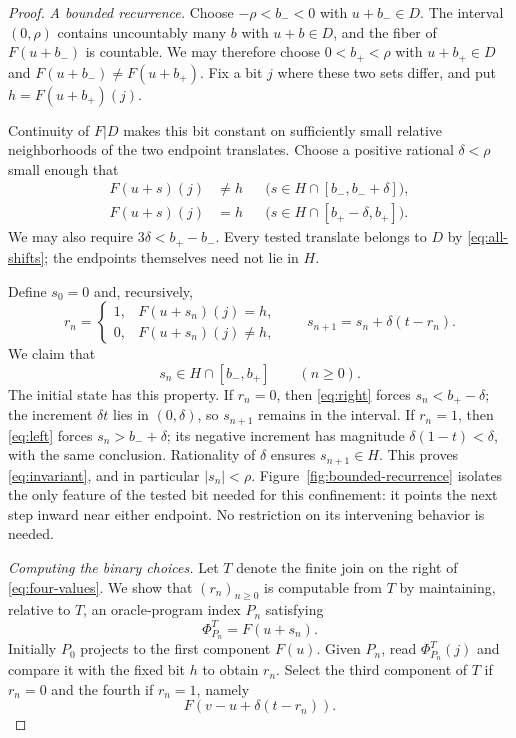 \begin{proof}
\medskip
\noindent\emph{A bounded recurrence.}
Choose $-\rho<b_-<0$ with $u+b_-\in D$. The interval
$(0,\rho)$ contains uncountably many $b$ with $u+b\in D$,
and the fiber of $F(u+b_-)$ is countable. We may therefore
choose $0<b_+<\rho$ with $u+b_+\in D$ and
$F(u+b_-)\ne F(u+b_+)$. Fix a bit $j$ where these two
sets differ, and put $h=F(u+b_+)(j)$.

Continuity of $F|D$ makes this bit constant on sufficiently
small relative neighborhoods of the two endpoint translates.
Choose a positive rational $\delta<\rho$ small enough that
\begin{align}
F(u+s)(j)&\ne h
&&\bigl(s\in H\cap[b_-,b_-+\delta]\bigr),\label{eq:left}\\
F(u+s)(j)&=h
&&\bigl(s\in H\cap[b_+-\delta,b_+]\bigr).\label{eq:right}
\end{align}
We may also require $3\delta<b_+-b_-$. Every tested
translate belongs to $D$ by \eqref{eq:all-shifts}; the
endpoints themselves need not lie in $H$.

Define $s_0=0$ and, recursively,
\begin{equation}\label{eq:recurrence}
r_n=
\begin{cases}
1,&F(u+s_n)(j)=h,\\
0,&F(u+s_n)(j)\ne h,
\end{cases}
\qquad
s_{n+1}=s_n+\delta(t-r_n).
\end{equation}
We claim that
\begin{equation}\label{eq:invariant}
s_n\in H\cap[b_-,b_+]\qquad(n\ge0).
\end{equation}
The initial state has this property. If $r_n=0$, then
\eqref{eq:right} forces $s_n<b_+-\delta$; the increment
$\delta t$ lies in $(0,\delta)$, so $s_{n+1}$ remains
in the interval. If $r_n=1$, then \eqref{eq:left} forces
$s_n>b_-+\delta$; its negative increment has magnitude
$\delta(1-t)<\delta$, with the same conclusion.
Rationality of $\delta$ ensures $s_{n+1}\in H$.
This proves \eqref{eq:invariant}, and in particular
$|s_n|<\rho$.
Figure~\ref{fig:bounded-recurrence} isolates the only feature of the
tested bit needed for this confinement: it points the next step
inward near either endpoint. No restriction on its intervening
behavior is needed.


\medskip
\noindent\emph{Computing the binary choices.}
Let $T$ denote the finite join on the right of
\eqref{eq:four-values}. We show that $(r_n)_{n\ge0}$ is
computable from $T$ by maintaining, relative to $T$, an
oracle-program index $P_n$ satisfying
\[
\Phi_{P_n}^{T}=F(u+s_n).
\]
Initially $P_0$ projects to the first component $F(u)$.
Given $P_n$, read $\Phi_{P_n}^{T}(j)$ and compare it with
the fixed bit $h$ to obtain $r_n$. Select the third component
of $T$ if $r_n=0$ and the fourth if $r_n=1$, namely
\[
F(v-u+\delta(t-r_n)).
\]


\end{proof}

